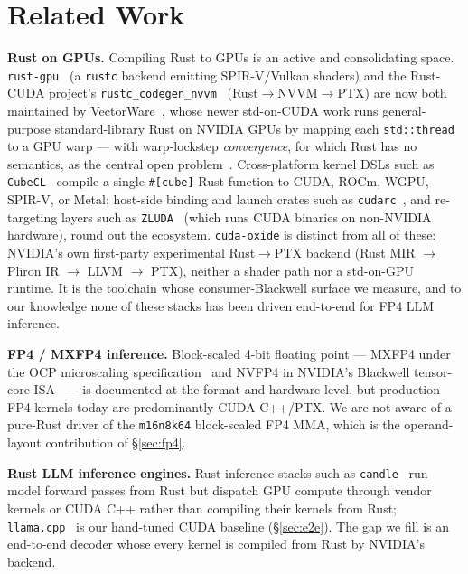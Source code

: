 \documentclass[11pt]{article}
\begin{document}
\section{Related Work}
\label{sec:related}
\textbf{Rust on GPUs.} Compiling Rust to GPUs is an active and consolidating space. \texttt{rust-gpu}~\citep{rustgpu} (a \texttt{rustc} backend emitting SPIR-V/Vulkan shaders) and the Rust-CUDA project's \texttt{rustc\_codegen\_nvvm}~\citep{rustcuda} (Rust$\rightarrow$NVVM$\rightarrow$PTX) are now both maintained by VectorWare~\citep{vectorware}, whose newer std-on-CUDA work runs general-purpose standard-library Rust on NVIDIA GPUs by mapping each \texttt{std::thread} to a GPU warp --- with warp-lockstep \emph{convergence}, for which Rust has no semantics, as the central open problem~\citep{kostrubiec2026}. Cross-platform kernel DSLs such as \texttt{CubeCL}~\citep{cubecl} compile a single \texttt{\#[cube]} Rust function to CUDA, ROCm, WGPU, SPIR-V, or Metal; host-side binding and launch crates such as \texttt{cudarc}~\citep{cudarc}, and re-targeting layers such as \texttt{ZLUDA}~\citep{zluda} (which runs CUDA binaries on non-NVIDIA hardware), round out the ecosystem. \texttt{cuda-oxide} is distinct from all of these: NVIDIA's own first-party experimental Rust$\rightarrow$PTX backend (Rust MIR $\rightarrow$ Pliron IR $\rightarrow$ LLVM $\rightarrow$ PTX), neither a shader path nor a std-on-GPU runtime. It is the toolchain whose consumer-Blackwell surface we measure, and to our knowledge none of these stacks has been driven end-to-end for FP4 LLM inference.

\textbf{FP4 / MXFP4 inference.} Block-scaled 4-bit floating point --- MXFP4 under the OCP microscaling specification~\citep{ocpmx} and NVFP4 in NVIDIA's Blackwell tensor-core ISA~\citep{ptxisa} --- is documented at the format and hardware level, but production FP4 kernels today are predominantly CUDA C++/PTX. We are not aware of a pure-Rust driver of the \texttt{m16n8k64} block-scaled FP4 MMA, which is the operand-layout contribution of \S\ref{sec:fp4}.

\textbf{Rust LLM inference engines.} Rust inference stacks such as \texttt{candle}~\citep{candle} run model forward passes from Rust but dispatch GPU compute through vendor kernels or CUDA C++ rather than compiling their kernels from Rust; \texttt{llama.cpp}~\citep{llamacpp} is our hand-tuned CUDA baseline (\S\ref{sec:e2e}). The gap we fill is an end-to-end decoder whose every kernel is compiled from Rust by NVIDIA's backend.
\end{document}
